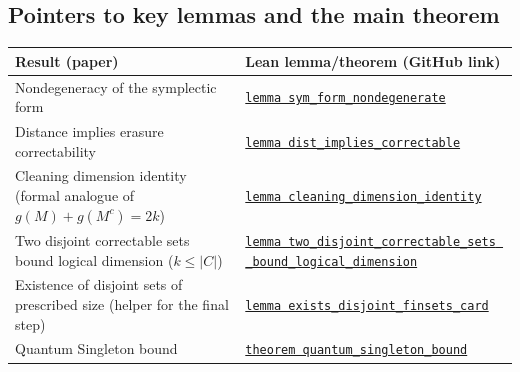 \documentclass[11pt]{article}
\theoremstyle{plain}
\theoremstyle{definition}
\begin{document}
\subsection{Pointers to key lemmas and the main theorem}
\begin{center}
\renewcommand{\arraystretch}{1.15}
\begin{tabular}{|p{}|p{}|}
\hline
\textbf{Result (paper)} & \textbf{Lean lemma/theorem (GitHub link)}\\
\hline
Nondegeneracy of the symplectic form &
\href{https://github.com/Shilun-Allan-Li/tcslib/blob/9c7f65d5b18b64bc56760a2a09dfe6fe3305b8d6/TCSlib/ErrorCorrectingCodes/QuantumSingleton.lean#L206-L219}{\texttt{lemma sym\_form\_nondegenerate}}\\
\hline
Distance implies erasure correctability &
\href{https://github.com/Shilun-Allan-Li/tcslib/blob/9c7f65d5b18b64bc56760a2a09dfe6fe3305b8d6/TCSlib/ErrorCorrectingCodes/QuantumSingleton.lean#L393-L412}{\texttt{lemma dist\_implies\_correctable}}\\
\hline
Cleaning dimension identity (formal analogue of $g(M)+g(M^c)=2k$) &
\href{https://github.com/Shilun-Allan-Li/tcslib/blob/9c7f65d5b18b64bc56760a2a09dfe6fe3305b8d6/TCSlib/ErrorCorrectingCodes/QuantumSingleton.lean#L869-L882}{\texttt{lemma cleaning\_dimension\_identity}}\\
\hline
Two disjoint correctable sets bound logical dimension ($k\le |C|$) &
\href{https://github.com/Shilun-Allan-Li/tcslib/blob/9c7f65d5b18b64bc56760a2a09dfe6fe3305b8d6/TCSlib/ErrorCorrectingCodes/QuantumSingleton.lean#L1002-L1031}{\texttt{lemma two\_disjoint\_correctable\_sets
\_bound\_logical\_dimension}}\\
\hline
Existence of disjoint sets of prescribed size (helper for the final step) &
\href{https://github.com/Shilun-Allan-Li/tcslib/blob/9c7f65d5b18b64bc56760a2a09dfe6fe3305b8d6/TCSlib/ErrorCorrectingCodes/QuantumSingleton.lean#L1218-L1252}{\texttt{lemma exists\_disjoint\_finsets\_card}}\\
\hline
Quantum Singleton bound &
\href{https://github.com/Shilun-Allan-Li/tcslib/blob/9c7f65d5b18b64bc56760a2a09dfe6fe3305b8d6/TCSlib/ErrorCorrectingCodes/QuantumSingleton.lean#L1253-L1399}{\texttt{theorem quantum\_singleton\_bound}}\\
\hline
\end{tabular}
\end{center}
\end{document}
